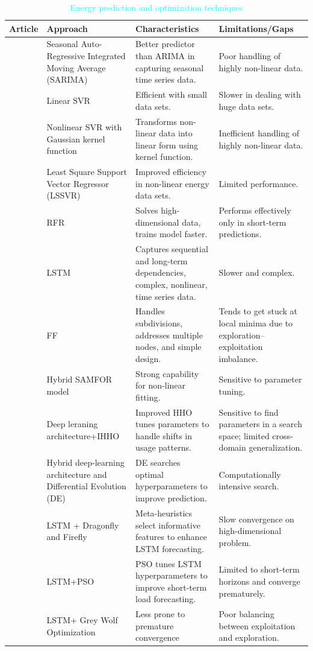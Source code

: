 \documentclass[journal]{IEEEtran}
\begin{document}
\begin{table}[!t]
\centering
\renewcommand{\arraystretch}{1.1}
\caption{\textcolor{cyan}{Energy prediction and optimization techniques}}
\label{tab:combined_comparison}
\begin{tabular}{p{0.8cm}p{3.1cm}p{5.1cm}p{5.1cm}}
\toprule
\textbf{Article} & 
\textbf{Approach} & 
\textbf{Characteristics} & 
\textbf{Limitations/Gaps} \\ 
\midrule
\cite{Ref40} & Seasonal Auto-Regressive Integrated
Moving Average (SARIMA) & Better predictor than ARIMA in capturing seasonal time series data. & Poor handling of highly non-linear data. \\
\cite{Ref44} & Linear SVR & Efficient with small data sets. & Slower in dealing with huge data sets. \\
\cite{Ref301} & Nonlinear SVR with Gaussian kernel function & Transforms non-linear data into linear form using kernel function. & Inefficient handling of highly non-linear data. \\
\cite{Ref47} & Least Square Support
Vector Regressor (LSSVR) & Improved efficiency in non-linear energy data sets. & Limited performance. \\
\cite{Ref6} & RFR & Solves high-dimensional data, trains model faster. & Performs effectively only in short-term predictions. \\
\cite{Ref45} & LSTM & Captures sequential and long-term dependencies, complex, nonlinear, time series data. & Slower and complex. \\
\cite{Ref25} & FF & Handles subdivisions, addresses multiple nodes, and simple design. & Tends to get stuck at local minima due to exploration–exploitation imbalance. \\
\cite{ref4} & Hybrid SAMFOR model & Strong capability for non-linear fitting. & Sensitive to parameter tuning. \\
\cite{RC59} & Deep leraning architecture+IHHO & Improved HHO tunes parameters to handle shifts in usage patterns. & Sensitive to find parameters in a search space; limited cross-domain generalization. \\
\cite{RC58} & Hybrid deep-learning architecture and Differential Evolution (DE)  & DE searches optimal hyperparameters to improve prediction. & Computationally intensive search. \\
\cite{RC57} & LSTM + Dragonfly and Firefly & Meta-heuristics select informative features to enhance LSTM forecasting. & Slow convergence on high-dimensional problem. \\
\cite{RC5} & LSTM+PSO & PSO tunes LSTM hyperparameters to improve short-term load forecasting. & Limited to short-term horizons and converge prematurely. \\
\cite{RC55} & LSTM+ Grey Wolf Optimization & Less prone to premature convergence & Poor balancing between exploitation and exploration. \\
\bottomrule
\end{tabular}
\end{table}
\end{document}
